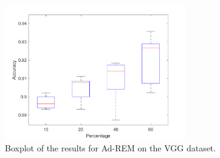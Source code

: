 \documentclass[11pt]{article}
\begin{document}
\begin{figure}[H]
	\centering
	\includegraphics[width=0.7\textwidth]{images/adrem_results_vgg.png}
	\caption{Boxplot of the results for Ad-REM on the VGG  dataset.}
	\label{fig:adrem_results_vgg}
\end{figure}
\end{document}

